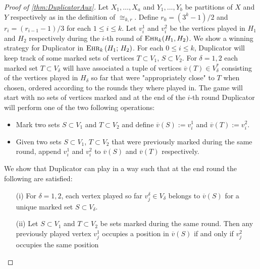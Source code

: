 \documentclass[12pt,notitlepage,a4paper]{article}
\theoremstyle{definition}
\newcommand{\ehr}{\textsc{Ehr}}
\begin{document}
\begin{proof}[Proof of \cref{thm:DuplicatorAux}]
	Let $X_1,\dots,X_a$ and 
	$Y_1,\dots,Y_b$ be partitions of 
	$X$ and $Y$ respectively
	as in the definition of $\cong_{k,r}$.
	Define $r_0=(3^k-1)/2$ and $r_i=(r_{i-1}-1)/3$ for each
	$1\leq i \leq k$. 
	Let $v^1_i$ and $v^2_i$ be the vertices played
	in $H_1$ and $H_2$ respectively during the $i$-th
	round of $\ehr_k(H_1,H_2)$. 
	We show a winning strategy for Duplicator
	in $\ehr_{k}\left(H_1;\, H_2\right)$. For each $0\leq i \leq k$,
	Duplicator will	keep track of some marked sets 
	of vertices $T\subset V_1$, $S\subset V_2$. 
	For $\delta=1,2$ each marked set
	$T\subset V_\delta$ will have associated a tuple
	of vertices $\overline{v}(T)\in V_\delta^*$ consisting
	of the vertices played in $H_\delta$ so far that were 
	"appropriately close" to $T$ when chosen,  ordered according
	to the rounds they where played in.
	The game will start with no sets of vertices marked and 
	at the end of the $i$-th
	round Duplicator will perform one of the two
	following operations:
	\begin{itemize}
	\item Mark two sets $S\subset V_1$ and $T\subset V_2$ and
	define $\overline{v}(S):=v^1_i$ and $\overline{v}(T):=v^2_i$.
	\item Given two sets $S\subset V_1$, $T\subset V_2$ that were 
	previously marked during the same round, append $v^1_i$
	and $v^2_i$ to $\overline{v}(S)$ and $\overline{v}(T)$ 
	respectively. 
	\end{itemize}
	We show that Duplicator can play in a way such that at the
	end round the following are satisfied:
	\begin{itemize}
		\item[(i)] For $\delta=1,2$, each vertex played
		so far $v^\delta_j\in V_\delta$ belongs to 
		$\overline{v}(S)$ for a	 unique marked set 
		$S\subset V_\delta$.
		\item[(ii)] Let $S\subset V_1$ and $T\subset V_2$ be sets
		marked during the same round. Then any previously played
		vertex $v^1_j$ occupies a position in $\overline{v}(S)$
		if and only if $v^2_j$ occupies the same position 

\end{itemize}
\end{proof}
\end{document}
